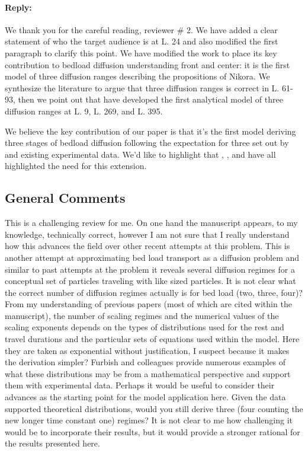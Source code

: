 \documentclass[11pt]{article}
\begin{document}
\paragraph{Reply:}
We thank you for the careful reading, reviewer \# 2. We have added a clear statement of who the target audience is at L. 24 and also modified the first paragraph to clarify this point. We have modified the work to place its key contribution to bedload diffusion understanding front and center: it is the first model of three diffusion ranges describing the propositions of Nikora. We synthesize the literature to argue that three diffusion ranges is correct in L. 61-93, then we point out that have developed the first analytical model of three diffusion ranges at L. 9, L. 269, and L. 395.  

We believe the key contribution of our paper is that it's the first model deriving three stages of bedload diffusion following the expectation for three set out by \citet{Nikora2001a} and existing experimental data. We'd like to highlight that \citet{Wu2019}, \citet{Wu2019a}, and \citet{Lajeunesse2018} have all highlighted the need for this extension. 

\subsection*{General Comments}
This is a challenging review for me. On one hand the manuscript appears, to my knowledge, technically correct, however I am not sure that I really understand how this advances the field over other recent attempts at this problem. This is another attempt at approximating bed load transport as a diffusion problem and similar to past attempts at the problem it reveals several diffusion regimes for a conceptual set of particles traveling with like sized particles. It is not clear what the correct number of diffusion regimes actually is for bed load (two, three, four)? From my understanding of previous papers (most of which are cited within the manuscript), the number of scaling regimes and the numerical values of the scaling exponents depends on the types of distributions used for the rest and travel durations and the particular sets of equations used within the model. Here they are taken as exponential without justification, I suspect because it makes the derivation simpler? Furbish and colleagues provide numerous examples of what these distributions may be from a mathematical perspective and support them with experimental data. Perhaps it would be useful to consider their advances as the starting point for the model application here. Given the data supported theoretical distributions, would you still derive three (four counting the new longer time constant one) regimes? It is not clear to me how challenging it would be to incorporate their results, but it would provide a stronger rational for the results presented here.
\end{document}
